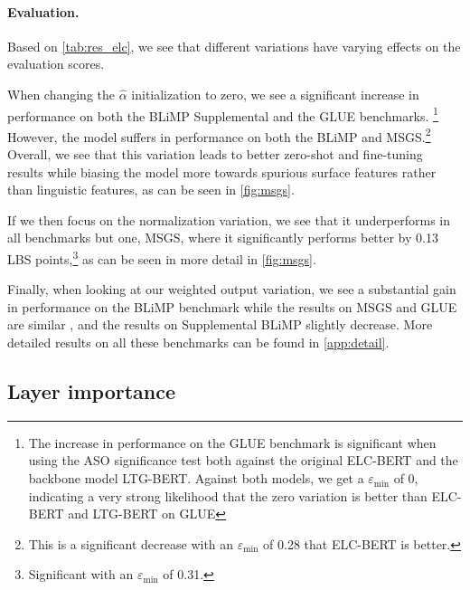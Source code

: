 \paragraph{Evaluation.}

Based on \cref{tab:res_elc}, we see that different variations have varying effects on the evaluation scores. 

When changing the $\hat{\alpha}$ initialization to zero, we see a significant increase in performance on both the BLiMP Supplemental and the GLUE benchmarks.%
\footnote{The increase in performance on the GLUE benchmark is significant when using the ASO significance test both against the original ELC-BERT and the backbone model LTG-BERT. Against both models, we get a $\varepsilon_{\min}$ of 0, indicating a very strong likelihood that the zero variation is better than ELC-BERT and LTG-BERT on GLUE} However, the model suffers in performance on both the BLiMP and MSGS.\footnote{This is a significant decrease with an $\varepsilon_{\min}$ of 0.28 that ELC-BERT is better.} Overall, we see that this variation leads to better zero-shot and fine-tuning results while biasing the model more towards spurious surface features rather than linguistic features, as can be seen in \cref{fig:msgs}. %

If we then focus on the normalization variation, we see that it underperforms in all benchmarks but one, MSGS, where it significantly performs better by 0.13 LBS points,\footnote{Significant with an $\varepsilon_{\min}$ of 0.31.} %
as can be seen in more detail in \cref{fig:msgs}.

Finally, when looking at our weighted output variation, we see a substantial gain in performance on the BLiMP benchmark %
while the results on MSGS and GLUE are similar%
, and the results on Supplemental BLiMP slightly decrease. %
More detailed results on all these benchmarks can be found in \cref{app:detail}.

\subsection{Layer importance}

